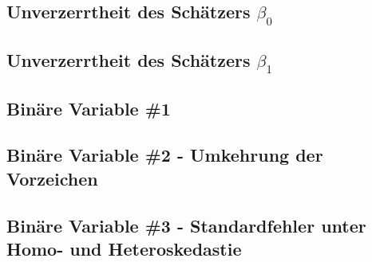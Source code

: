 % 

	\subsection{Unverzerrtheit des Schätzers $\beta_0$}
	\label{ssec:unbiasedness_beta_0}


	\subsection{Unverzerrtheit des Schätzers $\beta_1$}
	\label{ssec:unbiasedness_beta_1}


\subsection{Binäre Variable \#1}
\label{ssec:binare_variable_1}


\subsection{Binäre Variable \#2 - Umkehrung der Vorzeichen}
\label{ssec:binare_variable_2}


\subsection{Binäre Variable \#3 - Standardfehler unter Homo- und Heteroskedastie}
\label{ssec:binare_variable_3}

